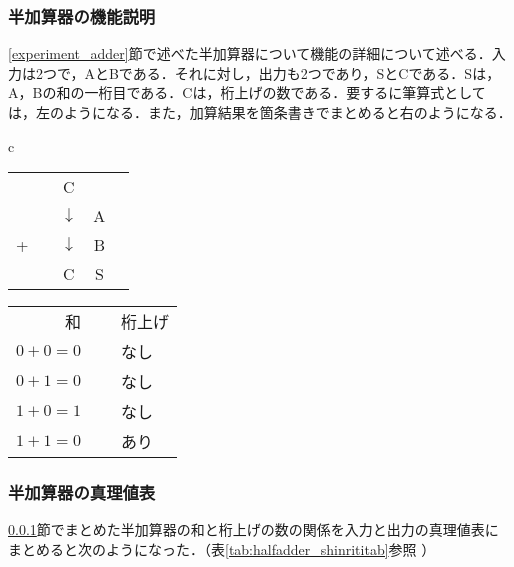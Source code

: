 %
%
\subsubsection{半加算器の機能説明}
\label{halfadder_explain}
\ref{experiment_adder}節で述べた半加算器について機能の詳細について述べる．入力は2つで，AとBである．それに対し，出力も2つであり，SとCである．Sは，A，Bの和の一桁目である．Cは，桁上げの数である．要するに筆算式としては，左のようになる．また，加算結果を箇条書きでまとめると右のようになる．

\begin {table}[ht]
\begin {center}
	\begin{tabular}{c}
		\begin{minipage}{7cm}
		\begin{center}
			\begin {tabular}{ccccc}
				&&C&\\
				&&$\downarrow $&A\\
				+&&$\downarrow $&B\\ \hline
				&&C&S
			\end{tabular}
		\end{center}
		\end{minipage}
		
		\begin{minipage}{7cm}
		\begin{center}
			\begin{tabular}{rcl}
				和&~&桁上げ\\
				$0+0=0$&~&なし\\
				$0+1=0$&~&なし\\
				$1+0=1$&~&なし\\
				$1+1=0$&~&あり
			\end{tabular}
		\end{center}
		\end{minipage}
		
	\end{tabular}
\end{center}
\end{table}

%
%
\subsubsection{半加算器の真理値表}
\label{halfadder_shinriti}
\ref{halfadder_explain}節でまとめた半加算器の和と桁上げの数の関係を入力と出力の真理値表にまとめると次のようになった．（表\ref{tab:halfadder_shinrititab}参照 ）

